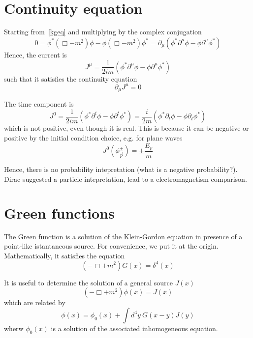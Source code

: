 \section{Continuity equation}

    Starting from~\eqref{kgeq} and multiplying by the complex conjugation 
    \begin{equation*}
        0 = \phi^* (\Box - m^2) \phi - \phi (\Box - m^2) \phi^* = \partial_\mu (\phi^* \partial^\mu \phi - \phi \partial^\mu \phi^*)
    \end{equation*}
    Hence, the current is 
    \begin{equation*}
        J^\mu = \frac{1}{2im} (\phi^* \partial^\mu \phi - \phi \partial^\mu \phi^*)
    \end{equation*}
    such that it satisfies the continuity equation 
    \begin{equation*}
        \partial_\mu J^\mu = 0
    \end{equation*}

    The time component is 
    \begin{equation*}
        J^0 = \frac{1}{2im} (\phi^* \partial^t \phi - \phi \partial^t \phi^*) = \frac{i}{2m} (\phi^* \partial_t \phi - \phi \partial_t \phi^*)
    \end{equation*}
    which is not positive, even though it is real. This is because it can be negative or positive by the initial condition choice, e.g. for plane waves 
    \begin{equation*}
        J^0 (\phi^\pm_{\vec p}) = \pm \frac{E_p}{m}
    \end{equation*}

    Hence, there is no probability intepretation (what is a negative probability?). Dirac suggested a particle intepretation, lead to a electromagnetism comparison.

\section{Green functions}

    The Green function is a solution of the Klein-Gordon equation in presence of a point-like istantaneous source. For convenience, we put it at the origin. Mathematically, it satisfies the equation 
    \begin{equation*}
        (- \Box + m^2) G(x) = \delta^4 (x)
    \end{equation*}
    
    It is useful to determine the solution of a general source $J(x)$ 
    \begin{equation*}
        (- \Box + m^2) \phi(x) = J (x)
    \end{equation*}
    which are related by 
    \begin{equation*}
        \phi (x) = \phi_0 (x) + \int d^4y ~ G(x-y) J (y)
    \end{equation*}
    wherw $\phi_0 (x)$ is a solution of the associated inhomogeneous equation.

